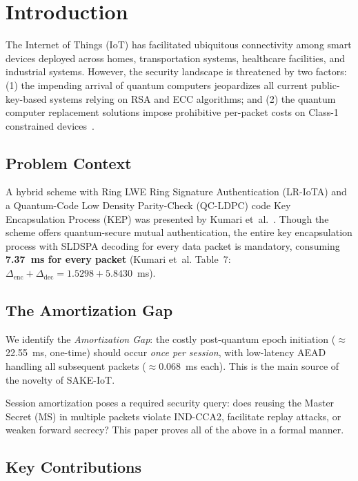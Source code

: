 \documentclass[conference]{IEEEtran}
\begin{document}
\section{Introduction}
\label{sec:intro}

The Internet of Things (IoT) has facilitated ubiquitous connectivity among smart devices deployed across homes, transportation systems, healthcare facilities, and industrial systems. However, the security landscape is threatened by two factors: (1) the impending arrival of quantum computers jeopardizes all current public-key-based systems relying on RSA and ECC algorithms; and (2) the quantum computer replacement solutions impose prohibitive per-packet costs on Class-1 constrained devices~\cite{rfc7228}.

\subsection{Problem Context}

A hybrid scheme with Ring LWE Ring Signature Authentication (LR-IoTA) and a Quantum-Code Low Density Parity-Check (QC-LDPC) code Key Encapsulation Process (KEP) was presented by Kumari et~al.~\cite{kumari2022}. Though the scheme offers quantum-secure mutual authentication, the entire key encapsulation process with SLDSPA decoding for every data packet is mandatory, consuming \textbf{7.37~ms for every packet} (Kumari et~al. Table~7: $\Delta_{\mathrm{enc}} + \Delta_{\mathrm{dec}} = 1.5298 + 5.8430$~ms).

\subsection{The Amortization Gap}

We identify the \emph{Amortization Gap}: the costly post-quantum epoch
initiation ($\approx$22.55~ms, one-time) should occur \emph{once per session}, with
low-latency AEAD handling all subsequent packets ($\approx$0.068~ms each).
This is the main source of the novelty of SAKE-IoT.

Session amortization poses a required security query: does reusing the
Master Secret (MS) in multiple packets violate IND-CCA2,
facilitate replay attacks, or weaken forward secrecy? This paper
proves all of the above in a formal manner.

\subsection{Key Contributions}
\end{document}
